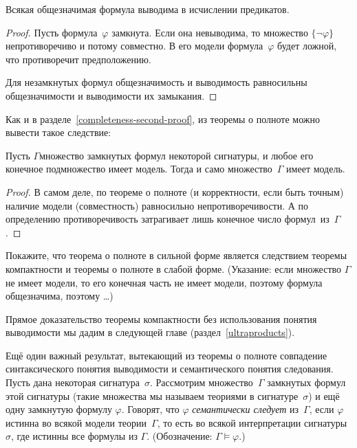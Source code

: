 \begin{theorem}
%
Всякая общезначимая формула выводима в исчислении предикатов.
\end{theorem}

\begin{proof}
Пусть формула~$\varphi$ замкнута. Если она невыводима, то
множество $\{\lnot \varphi\}$ непротиворечиво и потому
совместно. В его модели формула~$\varphi$ будет ложной, что
противоречит предположению.

Для незамкнутых формул общезначимость и
выводимость равносильны общезначимости и выводимости их
замыкания.
\end{proof}

Как и в разделе~\ref{completeness-second-proof}, из
теоремы о полноте можно вывести такое следствие:

\begin{theorem}
%
%
        \label{predicate-compactness-theorem}%
Пусть $\Gamma$\т множество замкнутых формул некоторой сигнатуры,
и любое его конечное подмножество имеет модель. Тогда и само
множество~$\Gamma$ имеет модель.
\end{theorem}

\begin{proof}
В самом деле, по теореме о полноте (и корректности, если быть
точным) наличие модели (совместность) равносильно
непротиворечивости. А по определению противоречивость
затрагивает лишь конечное число формул~из~$\Gamma$.
\end{proof}

\begin{problem}
Покажите, что теорема о полноте в сильной форме является
следствием теоремы компактности и теоремы о полноте в слабой
форме. (Указание: если множество $\Gamma$ не имеет модели,
то его конечная часть не имеет модели, поэтому формула
\hole общезначима, поэтому \dots)
\end{problem}

Прямое доказательство теоремы компактности без использования
понятия выводимости мы дадим в следующей главе
(раздел~\ref{ultraproducts}).

Ещё один важный результат, вытекающий из теоремы о полноте\т
совпадение синтаксического понятия выводимости и семантического
понятия следования. Пусть дана некоторая сигнатура~$\sigma$.
Рассмотрим множество~$\Gamma$ замкнутых формул этой сигнатуры
(такие множества мы называем теориями в сигнатуре~$\sigma$) и
ещё одну замк\-ну\-тую формулу $\varphi$. Говорят, что $\varphi$
\emph{семантически следует} из~$\Gamma$, если $\varphi$ истинна
во всякой модели теории~$\Gamma$, то есть во всякой
интерпретации сигнатуры~$\sigma$, где истинны все формулы
из $\Gamma$. (Обозначение: $\Gamma\vDash\varphi$.)

